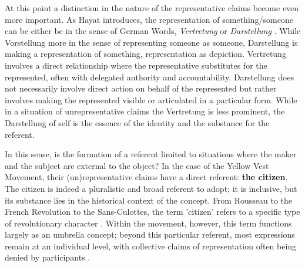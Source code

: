 At this point a distinction in the nature of the representative claims become
even more important. As Hayat introduces, the representation of
something/someone can be either be in the sense of German Words,
\textit{Vertretung} or \textit{Darstellung} \parencite[1039]{hayat2022}.
While
Vorstellung more in the sense of representing someone as someone, Darstellung is
making a representation of something, representation as depiction. Vertretung involves a direct relationship where the representative substitutes for the represented, often with delegated authority and accountability. Darstellung does not necessarily involve direct action on behalf of the represented but rather involves making the represented visible or articulated in a particular form. While in a situation of unrepresentative claims the Vertretung is less prominent, the Darstellung of self is the essence of the identity and the substance for the referent.

In this sense, is the formation of a referent limited to situations where the maker and the subject are external to the object? In the case of the Yellow Vest Movement, their (un)representative claims have a direct referent: \textbf{the citizen}. The citizen is indeed a pluralistic and broad referent to adopt; it is inclusive, but its substance lies in the historical context of the concept. From Rousseau to the French Revolution to the Sans-Culottes, the term 'citizen' refers to a specific type of revolutionary character \parencite[see 3-6]{hayat2024}. Within the movement, however, this term functions largely as an umbrella concept; beyond this particular referent, most expressions remain at an individual level, with collective claims of representation often being denied by participants \parencite[3]{hayat2024}.

